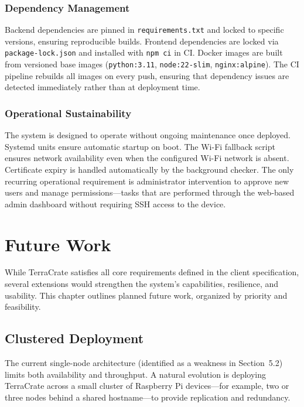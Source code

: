 \documentclass[12pt,letterpaper]{report}
\begin{document}
\subsection{Dependency Management}

Backend dependencies are pinned in \texttt{requirements.txt} and locked to specific versions, ensuring reproducible builds. Frontend dependencies are locked via \texttt{package-lock.json} and installed with \texttt{npm ci} in CI. Docker images are built from versioned base images (\texttt{python:3.11}, \texttt{node:22-slim}, \texttt{nginx:alpine}). The CI pipeline rebuilds all images on every push, ensuring that dependency issues are detected immediately rather than at deployment time.

\subsection{Operational Sustainability}

The system is designed to operate without ongoing maintenance once deployed. Systemd units ensure automatic startup on boot. The Wi-Fi fallback script ensures network availability even when the configured Wi-Fi network is absent. Certificate expiry is handled automatically by the background checker. The only recurring operational requirement is administrator intervention to approve new users and manage permissions---tasks that are performed through the web-based admin dashboard without requiring SSH access to the device.

\chapter{Future Work}

While TerraCrate satisfies all core requirements defined in the client specification, several extensions would strengthen the system's capabilities, resilience, and usability. This chapter outlines planned future work, organized by priority and feasibility.

\section{Clustered Deployment}

The current single-node architecture (identified as a weakness in Section~5.2) limits both availability and throughput. A natural evolution is deploying TerraCrate across a small cluster of Raspberry Pi devices---for example, two or three nodes behind a shared hostname---to provide replication and redundancy.
\end{document}
